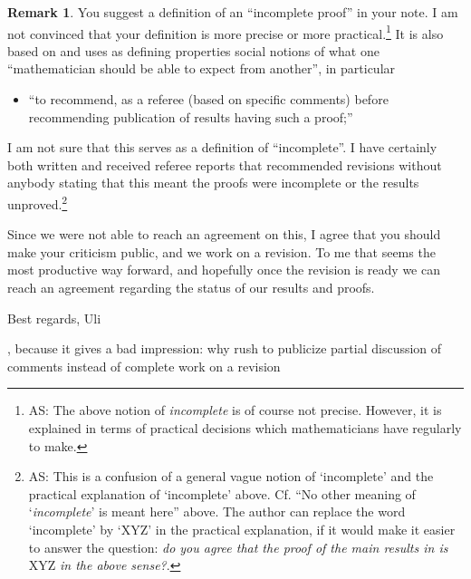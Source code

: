 \documentclass[12pt]{article}
\theoremstyle{plain}
\theoremstyle{definition}
\newtheorem{Remark}[Theorem]{Remark}
\begin{document}
{\begin{Remark}
You suggest a definition of an ``incomplete proof'' in your note.
I am not convinced that your definition is more precise or more practical.\footnote{AS: The above notion of {\it incomplete} is of course not precise.
However, it is explained in terms of practical decisions which mathematicians have regularly to make.}
It is also based on and uses as defining properties social notions of what one
``mathematician should be able to expect from another'', in particular

\begin{itemize}
\item[(2)] ``to recommend, as a referee (based on specific comments) before
recommending publication of results having such a proof;''
\end{itemize}

I am not sure that this serves as a definition of ``incomplete''.
I have certainly both written and received referee reports that recommended revisions without anybody stating
that this meant the proofs were incomplete or the results unproved.\footnote{AS: This is a confusion of a general vague notion of `incomplete' and the practical explanation of `incomplete' above.
Cf. ``No other meaning of `{\it incomplete}' is meant here'' above.
The author can replace the word `incomplete' by `XYZ' in the practical explanation, if it would make it easier to answer the question: {\it do you agree that the proof of the main results in
\cite{MW16} is} XYZ {\it in the above sense?}.}

Since we were not able to reach an agreement on this,
I agree that you should make your criticism public, and we work on a revision.
To me that seems the most productive way forward, and hopefully once the revision is ready we can reach
an agreement regarding the status of our results and proofs.

Best regards,
Uli
\end{Remark}


\comment

, because it gives a bad impression: why rush to publicize partial discussion of comments instead of complete work on a revision

}
\end{document}
